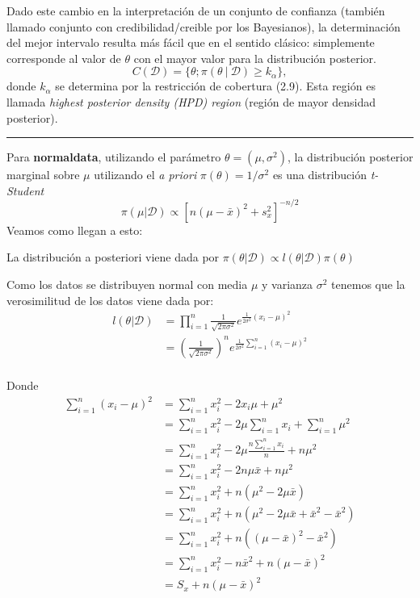 \documentclass[12pt,]{article}
\begin{document}
Dado este cambio en la interpretación de un conjunto de confianza
(también llamado conjunto con credibilidad/creible por los Bayesianos),
la determinación del mejor intervalo resulta más fácil que en el sentido
clásico: simplemente corresponde al valor de \(\theta\) con el mayor
valor para la distribución posterior. \[
C(\mathcal{D})=\{\theta; \pi(\theta\ |\ \mathcal{D})\ge k_{\alpha}\},
\] donde \(k_\alpha\) se determina por la restricción de cobertura
(2.9). Esta región es llamada \emph{highest posterior density (HPD)
region} (región de mayor densidad posterior).

\begin{center}\rule{0.5\linewidth}{\linethickness}\end{center}

Para \textbf{normaldata}, utilizando el parámetro
\(\theta=(\mu,\sigma^2)\), la distribución posterior marginal sobre
\(\mu\) utilizando el \emph{a priori} \(\pi(\theta)=1/\sigma^2\) es una
distribución \emph{t-Student} \[
\pi(\mu|\mathcal{D})\propto [n(\mu-\bar{x})^2+s_x^2]^{-n/2}
\] Veamos como llegan a esto:

La distribución a posteriori viene dada por
\(\pi(\theta|\mathcal{D})\propto l(\theta|\mathcal{D})\pi(\theta)\)

Como los datos se distribuyen normal con media \(\mu\) y varianza
\(\sigma^2\) tenemos que la verosimilitud de los datos viene dada por:
\[
\begin{array}{rl}
l(\theta|\mathcal{D}) & = \prod_{i=1}^n \frac{1}{\sqrt{2\pi\sigma^2}}e^{\frac{1}{2\sigma^2}(x_i-\mu)^2}\\
& =  \left( \frac{1}{\sqrt{2\pi\sigma^2}}\right)^n e^{\frac{1}{2\sigma^2}\sum_{i=1}^n (x_i-\mu)^2}\\
\end{array}
\]

Donde \[
\begin{array}{rl}
\sum_{i=1}^n (x_i-\mu)^2 & = \sum_{i=1}^n x_i^2 -2x_i\mu +\mu^2\\
& = \sum_{i=1}^n x_i^2 -2\mu\sum_{i=1}^n x_i +\sum_{i=1}^n \mu^2\\
& = \sum_{i=1}^n x_i^2 -2\mu\frac{n\sum_{i=1}^nx_i}{n}  +n \mu^2\\
& = \sum_{i=1}^n x_i^2 -2n\mu\bar x  +n \mu^2\\
& = \sum_{i=1}^n x_i^2 + n(\mu^2-2\mu\bar x )\\
& = \sum_{i=1}^n x_i^2 + n(\mu^2-2\mu\bar x +\bar x^2-\bar x^2)\\
& = \sum_{i=1}^n x_i^2 + n((\mu-\bar x)^2 -\bar x^2)\\
& = \sum_{i=1}^n x_i^2 - n\bar x^2 + n(\mu-\bar x)^2\\
& = S_x + n(\mu-\bar x)^2
\end{array}
\]
\end{document}
